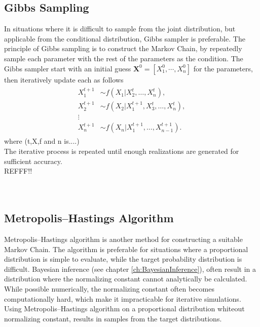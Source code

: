 \subsection{Gibbs Sampling}
In situations where it is difficult to sample from the joint distribution, but applicable from the conditional distribution, Gibbs sampler is preferable. The principle of Gibbs sampling is to construct the Markov Chain, by repeatedly sample each parameter with the rest of the parameters as the condition. The Gibbs sampler start with an initial guess $\boldsymbol{X}^{0}=[X_1^0,\cdots, X_n^0]$ for the parameters, then iteratively update each as follows
\begin{align}
\label{eq:gibbs}
\begin{split}
    X_1^{t+1}& \sim f(X_1|X_2^{t},\dotsc,X_n^{t}),\\
    X_2^{t+1}& \sim f(X_2|X_1^{t+1},X_3^{t},\dotsc,X_n^{t}),\\
    \vdots \\
    X_n^{t+1}& \sim f(X_n|X_1^{t+1},\dotsc,X_{n-1}^{t+1}).
\end{split}
\end{align}
where (t,X,f and n is....)\\
The iterative process is repeated until enough realizations are generated for sufficient accuracy.\\
REFFF!!
\cite[p.~141]{MCMC}\\
\cite[p.~209]{compstat}\\
\cite{GS}\\%
\subsection{Metropolis–Hastings Algorithm}
Metropolis–Hastings algorithm is another method for constructing a suitable Markov Chain. The algorithm is preferable for situations where a proportional distribution is simple to evaluate, while the target probability distribution is difficult. Bayesian inference (see chapter \ref{ch:BayesianInference}), often result in a distribution where the normalizing constant cannot analytically be calculated. While possible numerically, the normalizing constant often becomes computationally hard, which make it impracticable for iterative simulations. Using Metropolis–Hastings algorithm on a proportional distribution whiteout normalizing constant, results in samples from the target distributions. 

